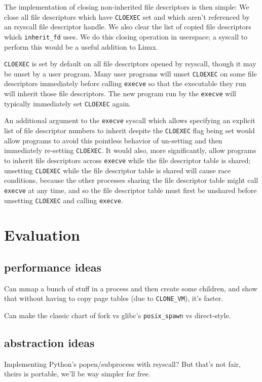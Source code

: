 \documentclass{acmart}
\begin{document}
The implementation of closing non-inherited file descriptors is then simple:
We close all file descriptors which have \texttt{CLOEXEC} set
and which aren't referenced by an rsyscall file descriptor handle.
We also clear the list of copied file descriptors which \verb|inherit_fd| uses.
We do this closing operation in userspace;
a syscall to perform this would be a useful addition to Linux.

\texttt{CLOEXEC} is set by default on all file descriptors opened by rsyscall,
though it may be unset by a user program.
Many user programs will unset \texttt{CLOEXEC} on some file descriptors immediately before calling \texttt{execve}
so that the executable they run will inherit those file descriptors.
The new program run by the \texttt{execve} will typically immediately set \texttt{CLOEXEC} again.

An additional argument to the \texttt{execve} syscall
which allows specifying an explicit list of file descriptor numbers to inherit despite the \texttt{CLOEXEC} flag being set
would allow programs to avoid this pointless behavior of un-setting and then immediately re-setting \texttt{CLOEXEC}.
It would also, more significantly, allow programs to inherit file descriptors across \texttt{execve}
while the file descriptor table is shared;
unsetting \texttt{CLOEXEC} while the file descriptor table is shared will cause race conditions,
because the other processes sharing the file descriptor table might call \texttt{execve} at any time,
and so the file descriptor table must first be unshared before unsetting \texttt{CLOEXEC} and calling \texttt{execve}.
\section{Evaluation}\label{evaluation}
\subsection{performance ideas}
Can mmap a bunch of stuff in a process and then create some children,
and show that without having to copy page tables (due to \verb|CLONE_VM|), it's faster.

Can make the classic chart of fork vs glibc's \verb|posix_spawn| vs direct-style.
\subsection{abstraction ideas}
Implementing Python's popen/subprocess with rsyscall?
But that's not fair, theirs is portable, we'll be way simpler for free.
\end{document}
